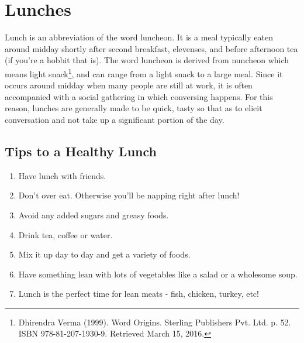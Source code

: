 \AddToShipoutPicture*{\SalmonVegetableRice}
\chapter{Lunches}

Lunch is an abbreviation of the word luncheon. It is a meal typically eaten around midday shortly after second breakfast, elevenses, and before afternoon tea (if you're a hobbit that is). The word luncheon is derived from nuncheon which means light snack\footnote{Dhirendra Verma (1999). Word Origins. Sterling Publishers Pvt. Ltd. p. 52. ISBN 978-81-207-1930-9. Retrieved March 15, 2016.}, and can range from a light snack to a large meal. Since it occurs around midday when many people are still at work, it is often accompanied with a social gathering in which conversing happens. For this reason, lunches are generally made to be quick, tasty so that as to elicit conversation and not take up a significant portion of the day.

\section*{Tips to a Healthy Lunch}
\begin{enumerate}
	\item Have lunch with friends.
	\item Don't over eat. Otherwise you'll be napping right after lunch!
	\item Avoid any added sugars and greasy foods.
	\item Drink tea, coffee or water.
	\item Mix it up day to day and get a variety of foods.
	\item Have something lean with lots of vegetables like a salad or a wholesome soup.
	\item Lunch is the perfect time for lean meats - fish, chicken, turkey, etc!
\end{enumerate}